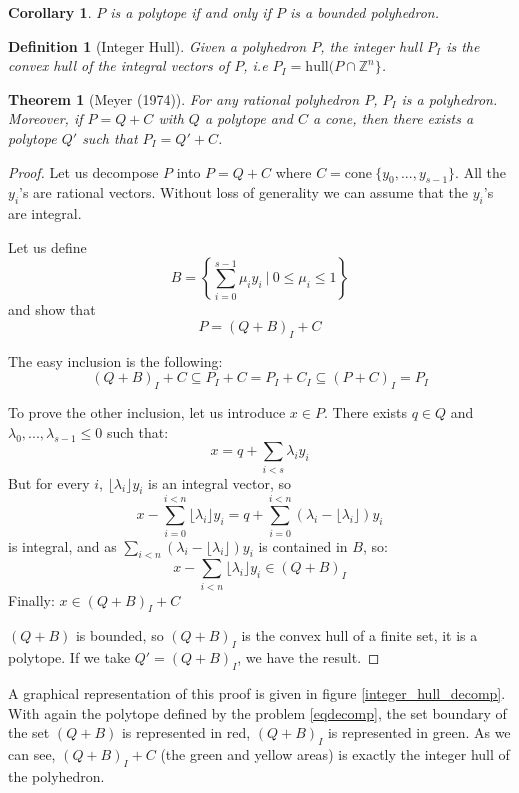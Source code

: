 \documentclass{article}
\newcommand{\cone}{\mathrm{cone}}
\newcommand{\hull}{\mathrm{hull}}
\newcommand{\ints}{\mathbb{Z}}
\newcommand{\ifff}{if and only if}
\newtheorem{definition}{Definition}
\newtheorem{theorem}{Theorem}
\newtheorem{corollary}{Corollary}
\begin{document}
\begin{corollary}
  $P$ is a polytope \ifff{} $P$ is a bounded polyhedron.
\end{corollary}

\begin{definition}[Integer Hull]
  Given a polyhedron $P$, the \textup{integer hull} $P_I$ is the convex hull of
  the integral vectors of $P$, i.e $P_I = \hull (P \cap \ints^n\}$.
\end{definition}

\begin{theorem}[Meyer (1974)]
\label{meyer theorem}
  For any rational polyhedron $P$, $P_I$ is a polyhedron. Moreover, if
  $P = Q + C$ with $Q$ a polytope and $C$ a cone, then there exists a polytope
  $Q'$ such that $P_I = Q' + C$.
\end{theorem}
\begin{proof}
  Let us decompose $P$ into $P = Q + C$ where
  $C = \cone~\{y_0, ..., y_{s-1}\}$. All the $y_i$'s are rational vectors.
  Without loss of generality we can assume that the $y_i$'s are integral.

  Let us define
  $$B = \left\{\sum_{i=0}^{s-1} \mu_i y_i~|~
               0 \leqslant \mu_i \leqslant 1\right\}$$
  and show that $$P = (Q + B)_I + C$$

  The easy inclusion is the following:
  $$(Q + B)_I + C \subseteq P_I + C = P_I + C_I \subseteq (P + C)_I = P_I$$

  To prove the other inclusion, let us introduce $x \in P$.
  There exists $q \in Q$ and $\lambda_0, ..., \lambda_{s-1}
  \leqslant 0$ such that: $$x = q + \sum_{i < s} \lambda_i y_i$$ But for every
  $i$, $\lfloor \lambda_i \rfloor y_i$ is an integral vector, so
  $$x - \sum_{i=0}^{i<n} \lfloor \lambda_i \rfloor y_i=
      q + \sum_{i=0}^{i<n} (\lambda_i - \lfloor \lambda_i \rfloor) y_i$$
  is integral, and as $\sum_{i<n} (\lambda_i - \lfloor \lambda_i \rfloor) y_i$
  is contained in $B$, so:
  $$x - \sum_{i<n} \lfloor \lambda_i \rfloor y_i \in (Q + B)_I$$
  Finally: $x \in (Q + B)_I + C$

  $(Q + B)$ is bounded, so $(Q + B)_I$ is the convex hull of a finite set, it is
  a polytope. If we take $Q' = (Q + B)_I$, we have the result.
\end{proof}

A graphical representation of this proof is given in figure
\ref{integer_hull_decomp}. With again the polytope defined by the problem
\ref{eqdecomp}, the set boundary of the set $(Q + B)$ is represented
in red, $(Q + B)_I$ is represented in green. As we can see, $(Q + B)_I + C$ (the
green and yellow areas) is exactly the integer hull of the polyhedron.
\end{document}
